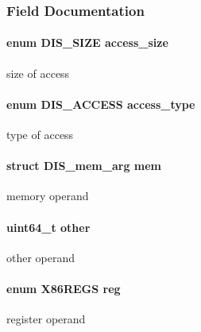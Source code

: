\subsubsection{Field Documentation}
\hypertarget{struct_d_i_s__arg_abe85ed51a3596cdb3a868a284c3d961f}{
\paragraph[{access\_\-size}]{\setlength{\rightskip}{0pt plus 5cm}enum {\bf DIS\_\-SIZE} {\bf access\_\-size}}}
\label{struct_d_i_s__arg_abe85ed51a3596cdb3a868a284c3d961f}
size of access \hypertarget{struct_d_i_s__arg_a5a7d33b48f73c1d560377f10471d8b00}{
\paragraph[{access\_\-type}]{\setlength{\rightskip}{0pt plus 5cm}enum {\bf DIS\_\-ACCESS} {\bf access\_\-type}}}
\label{struct_d_i_s__arg_a5a7d33b48f73c1d560377f10471d8b00}
type of access \hypertarget{struct_d_i_s__arg_a883edefb091b4875ffd7bb1f1e61dea3}{
\paragraph[{mem}]{\setlength{\rightskip}{0pt plus 5cm}struct {\bf DIS\_\-mem\_\-arg} {\bf mem}}}
\label{struct_d_i_s__arg_a883edefb091b4875ffd7bb1f1e61dea3}
memory operand \hypertarget{struct_d_i_s__arg_aabf8b24bd58cc13ea953e9add24d4387}{
\paragraph[{other}]{\setlength{\rightskip}{0pt plus 5cm}uint64\_\-t {\bf other}}}
\label{struct_d_i_s__arg_aabf8b24bd58cc13ea953e9add24d4387}
other operand \hypertarget{struct_d_i_s__arg_a426daf7e6de8cea3128731107457d2cf}{
\paragraph[{reg}]{\setlength{\rightskip}{0pt plus 5cm}enum {\bf X86REGS} {\bf reg}}}
\label{struct_d_i_s__arg_a426daf7e6de8cea3128731107457d2cf}
register operand 